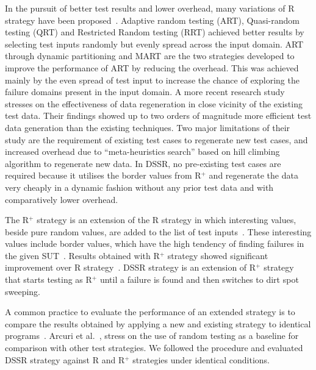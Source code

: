 In the pursuit of better test results and lower overhead, many variations of R strategy have been proposed~\cite{chen2004mirror, chen2007quasi, chen2010adaptive, chan2006restricted, chen2004adaptive}. Adaptive random testing (ART), Quasi-random testing (QRT) and Restricted Random testing (RRT) achieved better results by selecting test inputs randomly but evenly spread across the input domain. ART through dynamic partitioning and MART are the two strategies developed to improve the performance of ART by reducing the overhead. This was achieved mainly by the even spread of test input to increase the chance of exploring the failure domains present in the input domain. A more recent research study~\cite{yoo2012test} stresses on the effectiveness of data regeneration in close vicinity of the existing test data. Their findings showed up to two orders of magnitude more efficient test data generation than the existing techniques. Two major limitations of their study are the requirement of existing test cases to regenerate new test cases, and increased overhead due to ``meta-heuristics search'' based on hill climbing algorithm to regenerate new data. In DSSR, no pre-existing test cases are required because it utilises the border values from R$^+$ and regenerate the data very cheaply in a dynamic fashion without any prior test data and with comparatively lower overhead. 
  
The R$^+$ strategy is an extension of the R strategy in which interesting values, beside pure random values, are added to the list of test inputs~\cite{leitner2007reconciling}. These interesting values include border values, which have the high tendency of finding failures in the given SUT~\cite{beizer2003software}. Results obtained with R$^+$ strategy showed significant improvement over R strategy~\cite{leitner2007reconciling}. DSSR strategy is an extension of R$^+$ strategy that starts testing as R$^+$ until a failure is found and then switches to dirt spot sweeping.



A common practice to evaluate the performance of an extended strategy is to compare the results obtained by applying a new and existing strategy to identical programs~\cite{hamlet1990partition, duran1984evaluation, gutjahr1999partition}. Arcuri et al.~\cite{arcuri2012random}, stress on the use of random testing as a baseline for comparison with other test strategies. We followed the procedure and evaluated DSSR strategy against R and R$^+$ strategies under identical conditions.

